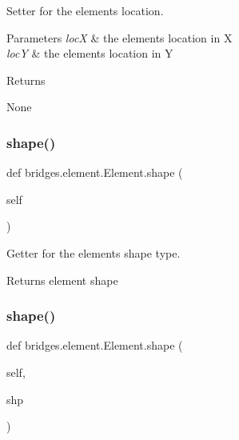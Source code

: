 Setter for the element\textquotesingle{}s location. 


\begin{DoxyParams}{Parameters}
{\em locX} & the element\textquotesingle{}s location in X \\
\hline
{\em locY} & the element\textquotesingle{}s location in Y \\
\hline
\end{DoxyParams}
\begin{DoxyReturn}{Returns}


None 
\end{DoxyReturn}
\mbox{\label{classbridges_1_1element_1_1_element_a4485e4854639bcb163a36d0629f0e8f9}} 
\subsubsection{\texorpdfstring{shape()}{shape()}\hspace{0.1cm}{\footnotesize\ttfamily [1/2]}}
{\footnotesize\ttfamily def bridges.\+element.\+Element.\+shape (\begin{DoxyParamCaption}\item[{}]{self }\end{DoxyParamCaption})}



Getter for the element\textquotesingle{}s shape type. 

\begin{DoxyReturn}{Returns}
element shape 
\end{DoxyReturn}
\mbox{\label{classbridges_1_1element_1_1_element_a54d45aa4c09c0b5745cebbabcc0c02f9}} 
\subsubsection{\texorpdfstring{shape()}{shape()}\hspace{0.1cm}{\footnotesize\ttfamily [2/2]}}
{\footnotesize\ttfamily def bridges.\+element.\+Element.\+shape (\begin{DoxyParamCaption}\item[{}]{self,  }\item[{}]{shp }\end{DoxyParamCaption})}



